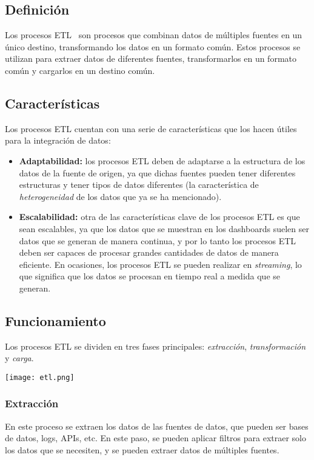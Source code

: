 \subsection{Definición}
Los procesos ETL~\cite{mier2023dashboards} son procesos que combinan datos de múltiples
fuentes en un único destino, transformando los datos en un formato común. Estos procesos
se utilizan para extraer datos de diferentes fuentes, transformarlos en un formato común
y cargarlos en un destino común.

\subsection{Características}
Los procesos ETL cuentan con una serie de características que los hacen útiles para la
integración de datos:

\begin{itemize}
	\item \textbf{Adaptabilidad:} los procesos ETL deben de adaptarse a la estructura de los
		datos de la fuente de origen, ya que dichas fuentes pueden tener diferentes estructuras
		y tener tipos de datos diferentes (la característica de \textit{heterogeneidad} de los
		datos que ya se ha mencionado).
	\item \textbf{Escalabilidad:} otra de las características clave de los procesos ETL es que sean
		escalables, ya que los datos que se muestran en los dashboards suelen ser datos que se generan
		de manera continua, y por lo tanto los procesos ETL deben ser capaces de procesar grandes cantidades
		de datos de manera eficiente. En ocasiones, los procesos ETL se pueden realizar en \textit{streaming},
		lo que significa que los datos se procesan en tiempo real a medida que se generan.
\end{itemize}
\newpage{}
\subsection{Funcionamiento}
Los procesos ETL se dividen en tres fases principales: \textit{extracción}, \textit{transformación}
y \textit{carga}.

\begin{minipage}{\linewidth}
	\centering
	\texttt{[image: etl.png]}
\end{minipage}

\subsubsection{Extracción}
En este proceso se extraen los datos de las fuentes de datos, que pueden ser bases de datos, logs,
APIs, etc. En este paso, se pueden aplicar filtros para extraer solo los datos que se necesiten, y
se pueden extraer datos de múltiples fuentes.

